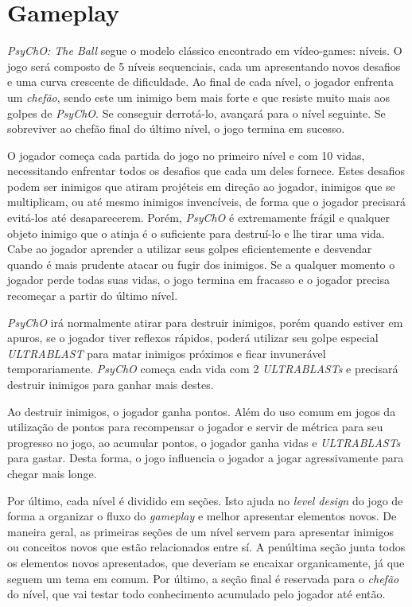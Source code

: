 \section{Gameplay}
\label{sec:gameplay}

\textit{PsyChO: The Ball} segue o modelo clássico encontrado em vídeo-games: níveis. O jogo será composto de 5 níveis sequenciais, cada um apresentando novos desafios e uma curva crescente de dificuldade. Ao final de cada nível, o jogador enfrenta um \textit{chefão}, sendo este um inimigo bem mais forte e que resiste muito mais aos golpes de \textit{PsyChO}. Se conseguir derrotá-lo, avançará para o nível seguinte. Se sobreviver ao chefão final do último nível, o jogo termina em sucesso.

O jogador começa cada partida do jogo no primeiro nível e com 10 vidas, necessitando enfrentar todos os desafios que cada um deles fornece. Estes desafios podem ser inimigos que atiram projéteis em direção ao jogador, inimigos que se multiplicam, ou até mesmo inimigos invencíveis, de forma que o jogador precisará evitá-los até desaparecerem. Porém, \textit{PsyChO} é extremamente frágil e qualquer objeto inimigo que o atinja é o suficiente para destruí-lo e lhe tirar uma vida. Cabe ao jogador aprender a utilizar seus golpes eficientemente e desvendar quando é mais prudente atacar ou fugir dos inimigos. Se a qualquer momento o jogador perde todas suas vidas, o jogo termina em fracasso e o jogador precisa recomeçar a partir do último nível.

\textit{PsyChO} irá normalmente atirar para destruir inimigos, porém quando estiver em apuros, se o jogador tiver reflexos rápidos, poderá utilizar seu golpe especial \textit{ULTRABLAST} para matar inimigos próximos e ficar invunerável temporariamente. \textit{PsyChO} começa cada vida com 2 \textit{ULTRABLASTs} e precisará destruir inimigos para ganhar mais destes.

Ao destruir inimigos, o jogador ganha pontos. Além do uso comum em jogos da utilização de pontos para recompensar o jogador e servir de métrica para seu progresso no jogo, ao acumular pontos, o jogador ganha vidas e \textit{ULTRABLASTs} para gastar. Desta forma, o jogo influencia o jogador a jogar agressivamente para chegar mais longe.

Por último, cada nível é dividido em seções. Isto ajuda no \textit{level design} do jogo de forma a organizar o fluxo do \textit{gameplay} e melhor apresentar elementos novos. De maneira geral, as primeiras seções de um nível servem para apresentar inimigos ou conceitos novos que estão relacionados entre sí. A penúltima seção junta todos os elementos novos apresentados, que deveriam se encaixar organicamente, já que seguem um tema em comum. Por último, a seção final é reservada para o \textit{chefão} do nível, que vai testar todo conhecimento acumulado pelo jogador até então.

